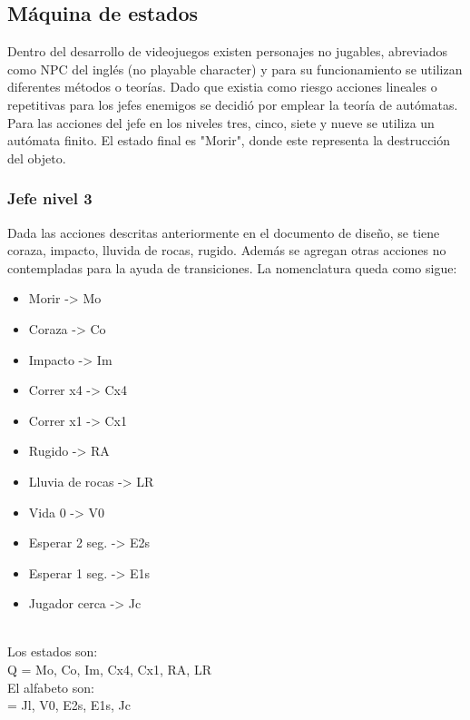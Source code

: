 \subsection{Máquina de estados}\label{maquinaEdos}
Dentro del desarrollo de videojuegos existen personajes no jugables, abreviados como NPC del inglés (no playable character) y para su funcionamiento se utilizan diferentes métodos o teorías.
Dado que existia como riesgo acciones lineales o repetitivas para los jefes enemigos se decidió por emplear la teoría de autómatas.
Para las acciones del jefe en los niveles tres, cinco, siete y nueve se utiliza un autómata finito. El estado final es "Morir", donde este representa la destrucción del objeto. 
	\\[1pt]
	
\subsubsection{Jefe nivel 3}
Dada las acciones descritas anteriormente en el documento de diseño, se tiene coraza, impacto, lluvida de rocas, rugido. Además se agregan otras acciones no contempladas para la ayuda de transiciones.
La nomenclatura queda como sigue:
	\\[1pt]
	
\begin{itemize}
	\item Morir -> Mo
	\item Coraza -> Co
	\item Impacto -> Im
	\item Correr x4 -> Cx4
	\item Correr x1 -> Cx1
	\item Rugido -> RA
	\item Lluvia de rocas -> LR
	\item Vida 0 -> V0
	\item Esperar 2 seg. -> E2s
	\item Esperar 1 seg. -> E1s
	\item Jugador cerca -> Jc
\end{itemize}
	\\[1pt]

Los estados son:
	\\[1pt]
	Q = {Mo, Co, Im, Cx4, Cx1, RA, LR}
		\\[1pt]
		
El alfabeto son:
	\\[1pt]
	\sigma = {Jl, V0, E2s, E1s, Jc}
		\\[1pt]
		
